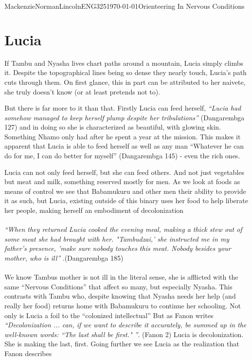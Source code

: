 \documentclass{article}
\begin{document}
\begin{mla}{Mackenzie}{Norman}{Lincoln}{ENG325}{\today}{Orienteering In Nervous Conditions}
\section*{Lucia}
If Tambu and Nyasha lives chart paths around a mountain, Lucia simply climbs it. Despite the topographical lines being so dense they nearly touch, Lucia's path cuts through them. On first glance, this in part can be attributed to her naivete, she truly doesn't know (or at least pretends not to). 

But there is far more to it than that. Firstly Lucia can feed herself, \textit{``Lucia had somehow managed to keep herself plump despite her tribulations''} (Dangarembga 127) and in doing so she is characterized as beautiful, with glowing skin. Something Nhamo only had after he spent a year at the mission. This makes it apparent that Lucia is able to feed herself as well as any man ``Whatever he can do for me, I can do better for myself'' (Dangarembga 145) - even the rich ones. 

Lucia can not only feed herself, but she can feed others. And not just vegetables but meat and milk, something reserved mostly for men. As we look at foods as means of control we see that Babamukuru and other men their ability to provide it as such, but Lucia, existing outside of this binary uses her food to help liberate her people, making herself an embodiment of decolonization \paragraph{}
\textit{``When they returned Lucia cooked the evening meal, making a thick stew out of some meat she had brought with her. "Tambudzai,' she instructed me in my father's presence, 'make sure nobody touches this meat. Nobody besides your mother, who is ill'' }.(Dangarembga 185)
\paragraph{}
 We know Tambus mother is not ill in the literal sense,  she is afflicted with the same ``Nervous Conditions'' that affect so many, but especially Nyasha. This contrasts with Tambu who, despite knowing that Nyasha needs her help (and really her food) returns home with Babamukuru to continue her schooling. Not only is Lucia a foil to the ``colonized intellectual'' But as Fanon writes \textit{``Decolonization ... can, if we want to describe it accurately, be summed up in the well-known words: ``The last shall be first." ''}. (Fanon 2) Lucia is decolonization. She is making the last, first. Going further we see Lucia as the realization that Fanon describes 

\end{mla}
\end{document}
